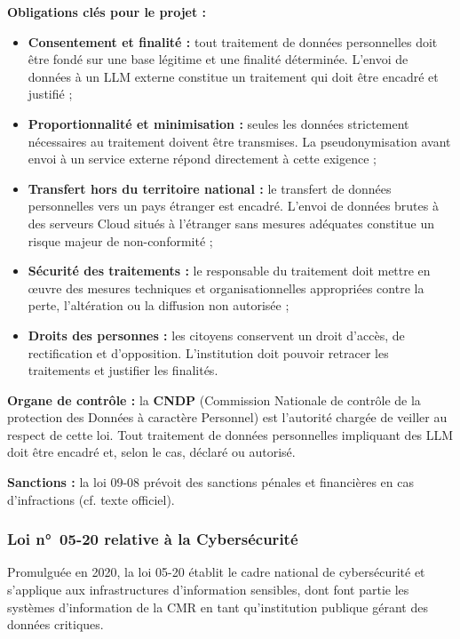 \documentclass[12pt, a4paper]{report}
\begin{document}
\textbf{Obligations clés pour le projet :}
\begin{itemize}
  \item \textbf{Consentement et finalité :} tout traitement de données
        personnelles doit être fondé sur une base légitime et une
        finalité déterminée. L'envoi de données à un LLM externe
        constitue un traitement qui doit être encadré et justifié ;
  \item \textbf{Proportionnalité et minimisation :} seules les données
        strictement nécessaires au traitement doivent être transmises.
        La pseudonymisation avant envoi à un service externe répond
        directement à cette exigence ;
  \item \textbf{Transfert hors du territoire national :} le transfert de
        données personnelles vers un pays étranger est encadré. L'envoi
        de données brutes à des serveurs Cloud situés à l'étranger sans
        mesures adéquates constitue un risque majeur de non-conformité ;
  \item \textbf{Sécurité des traitements :} le responsable du traitement
        doit mettre en œuvre des mesures techniques et organisationnelles
        appropriées contre la perte, l'altération ou la diffusion non
        autorisée ;
  \item \textbf{Droits des personnes :} les citoyens conservent un droit
        d'accès, de rectification et d'opposition. L'institution doit
        pouvoir retracer les traitements et justifier les finalités.
\end{itemize}

\textbf{Organe de contrôle :} la \textbf{CNDP} (Commission Nationale de
contrôle de la protection des Données à caractère Personnel) est
l'autorité chargée de veiller au respect de cette loi. Tout traitement
de données personnelles impliquant des LLM doit être encadré et, selon
le cas, déclaré ou autorisé.

\textbf{Sanctions :} la loi 09-08 prévoit des sanctions pénales et
financières en cas d'infractions (cf. texte officiel).

\subsubsection{Loi n°~05-20 relative à la Cybersécurité}

Promulguée en 2020, la loi 05-20 établit le cadre national de
cybersécurité et s'applique aux infrastructures d'information sensibles,
dont font partie les systèmes d'information de la CMR en tant
qu'institution publique gérant des données critiques.
\end{document}
